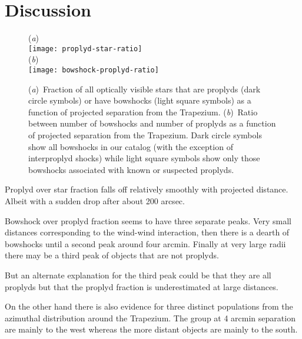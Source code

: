 \documentclass[apj, twocolumn]{aastex63}
\renewcommand\clearpage{}
\begin{document}
\label{sec:notshell}



\clearpage
\section{Discussion}
\label{sec:discuss}
\begin{figure}
  (\textit{a})\\
  \texttt{[image: proplyd-star-ratio]}\\
  (\textit{b})\\
  \texttt{[image: bowshock-proplyd-ratio]}
  \caption{(\textit{a})~Fraction of all optically visible stars that
    are proplyds (dark circle symbols) or have bowshocks (light square
    symbols) as a function of projected separation from the Trapezium.
    (\textit{b})~Ratio between number of bowshocks and number of
    proplyds as a function of projected separation from the Trapezium.
    Dark circle symbols show all bowshocks in our catalog (with the
    exception of interproplyd shocks) while light square symbols show
    only those bowshocks associated with known or suspected proplyds.
  }
  \label{fig:bow-proplyd-star-ratios}
\end{figure}

Proplyd over star fraction falls off relatively smoothly with
projected distance.  Albeit with a sudden drop after about
200 arcsec.


Bowshock over proplyd fraction seems to have three separate peaks.
Very small distances corresponding to the wind-wind interaction,
then there is a dearth of bowshocks until a second peak around
four arcmin.  Finally at very large radii there may be a third
peak of objects that are not proplyds.

But an alternate explanation for the third peak could be that
they are all proplyds but that the proplyd fraction is
underestimated at large distances.

On the other hand there is also evidence for three distinct
populations from the azimuthal distribution around the Trapezium.
The group at 4 arcmin separation are mainly to the west whereas
the more distant objects are mainly to the south.
\end{document}
